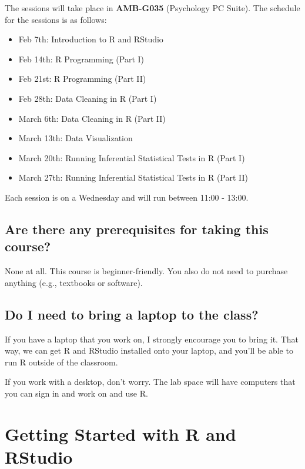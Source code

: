 \documentclass[
]{book}
\begin{document}
The sessions will take place in \textbf{AMB-G035} (Psychology PC Suite). The schedule for the sessions is as follows:

\begin{itemize}
\item
  Feb 7th: Introduction to R and RStudio
\item
  Feb 14th: R Programming (Part I)
\item
  Feb 21st: R Programming (Part II)
\item
  Feb 28th: Data Cleaning in R (Part I)
\item
  March 6th: Data Cleaning in R (Part II)
\item
  March 13th: Data Visualization
\item
  March 20th: Running Inferential Statistical Tests in R (Part I)
\item
  March 27th: Running Inferential Statistical Tests in R (Part II)
\end{itemize}

Each session is on a Wednesday and will run between 11:00 - 13:00.

\hypertarget{are-there-any-prerequisites-for-taking-this-course}{%
\section{Are there any prerequisites for taking this course?}\label{are-there-any-prerequisites-for-taking-this-course}}

None at all. This course is beginner-friendly. You also do not need to purchase anything (e.g., textbooks or software).

\hypertarget{do-i-need-to-bring-a-laptop-to-the-class}{%
\section{Do I need to bring a laptop to the class?}\label{do-i-need-to-bring-a-laptop-to-the-class}}

If you have a laptop that you work on, I strongly encourage you to bring it. That way, we can get R and RStudio installed onto your laptop, and you'll be able to run R outside of the classroom.

If you work with a desktop, don't worry. The lab space will have computers that you can sign in and work on and use R.

\hypertarget{rstudio}{%
\chapter{\texorpdfstring{\textbf{Getting Started with R and RStudio}}{Getting Started with R and RStudio}}\label{rstudio}}
\end{document}
